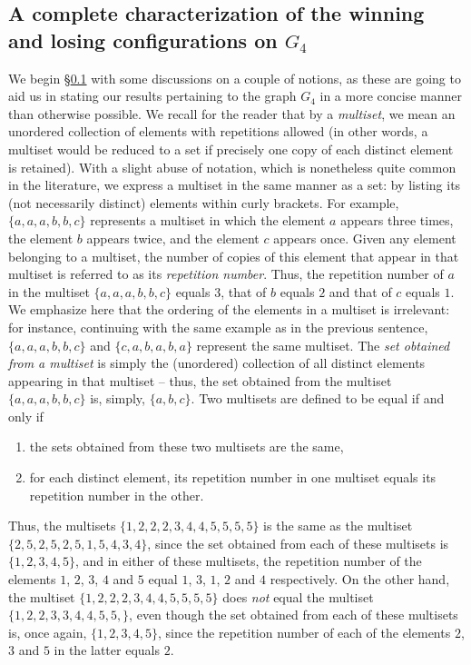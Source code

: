 \documentclass[11pt,reqno]{amsart}
\theoremstyle{definition}
\theoremstyle{definition}
\begin{document}
\subsection{A complete characterization of the winning and losing configurations on $G_{4}$}\label{subsubsec:G_{4}_main_results}
We begin \S\ref{subsubsec:G_{4}_main_results} with some discussions on a couple of notions, as these are going to aid us in stating our results pertaining to the graph $G_{4}$ in a more concise manner than otherwise possible. We recall for the reader that by a \emph{multiset}, we mean an unordered collection of elements with repetitions allowed (in other words, a multiset would be reduced to a set if precisely one copy of each distinct element is retained). With a slight abuse of notation, which is nonetheless quite common in the literature, we express a multiset in the same manner as a set: by listing its (not necessarily distinct) elements within curly brackets. For example, $\{a, a, a, b, b, c\}$ represents a multiset in which the element $a$ appears three times, the element $b$ appears twice, and the element $c$ appears once. Given any element belonging to a multiset, the number of copies of this element that appear in that multiset is referred to as its \emph{repetition number}. Thus, the repetition number of $a$ in the multiset $\{a, a, a, b, b, c\}$ equals $3$, that of $b$ equals $2$ and that of $c$ equals $1$. We emphasize here that the ordering of the elements in a multiset is irrelevant: for instance, continuing with the same example as in the previous sentence, $\{a, a, a, b, b, c\}$ and $\{c, a, b, a, b, a\}$ represent the same multiset. The \emph{set obtained from a multiset} is simply the (unordered) collection of all distinct elements appearing in that multiset -- thus, the set obtained from the multiset $\{a,a,a,b,b,c\}$ is, simply, $\{a,b,c\}$. Two multisets are defined to be equal if and only if 
\begin{enumerate}
\item the sets obtained from these two multisets are the same,
\item for each distinct element, its repetition number in one multiset equals its repetition number in the other.
\end{enumerate}
Thus, the multisets $\{1,2,2,2,3,4,4,5,5,5,5\}$ is the same as the multiset $\{2,5,2,5,2,5,1,5,4,3,4\}$, since the set obtained from each of these multisets is $\{1,2,3,4,5\}$, and in either of these multisets, the repetition number of the elements $1$, $2$, $3$, $4$ and $5$ equal $1$, $3$, $1$, $2$ and $4$ respectively. On the other hand, the multiset $\{1,2,2,2,3,4,4,5,5,5,5\}$ does \emph{not} equal the multiset $\{1,2,2,3,3,4,4,5,5,\}$, even though the set obtained from each of these multisets is, once again, $\{1,2,3,4,5\}$, since the repetition number of each of the elements $2$, $3$ and $5$ in the latter equals $2$.
 
\end{document}
